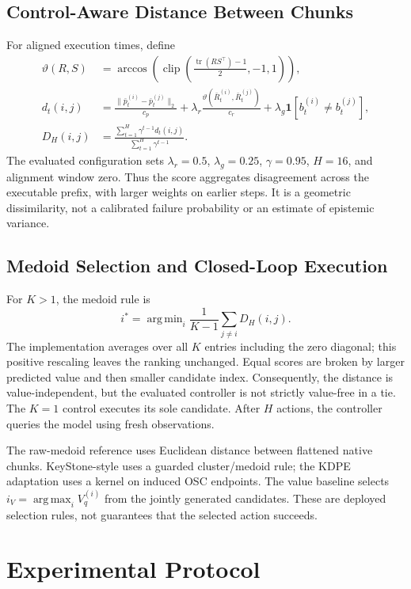 \documentclass{article}
\newcommand{\ind}{\mathbf{1}}
\DeclareMathOperator*{\argmax}{arg\,max}
\DeclareMathOperator*{\argmin}{arg\,min}
\DeclareMathOperator{\clip}{clip}
\DeclareMathOperator{\tr}{tr}
\begin{document}
\subsection{Control-Aware Distance Between Chunks}
For aligned execution times, define
\begin{align}
 \vartheta(R,S)
 &=\arccos\left(\clip\left(\frac{\tr(RS^\top)-1}{2},-1,1\right)\right),\\
 d_t(i,j)
 &=\frac{\|\bar p_t^{(i)}-\bar p_t^{(j)}\|_2}{c_p}
 +\lambda_r\frac{\vartheta(\bar R_t^{(i)},\bar R_t^{(j)})}{c_r}
 +\lambda_g\ind[b_t^{(i)}\ne b_t^{(j)}],\label{eq:action-distance}\\
 D_H(i,j)
 &=\frac{\sum_{t=1}^{H}\gamma^{t-1}d_t(i,j)}
         {\sum_{t=1}^{H}\gamma^{t-1}}.\label{eq:chunk-distance}
\end{align}
The evaluated configuration sets $\lambda_r=0.5$, $\lambda_g=0.25$,
$\gamma=0.95$, $H=16$, and alignment window zero. Thus the score aggregates
disagreement across the executable prefix, with larger weights on earlier
steps. It is a geometric dissimilarity, not a calibrated failure probability
or an estimate of epistemic variance.

\subsection{Medoid Selection and Closed-Loop Execution}
For $K>1$, the medoid rule is
\begin{equation}
 i^*=\argmin_i\frac{1}{K-1}\sum_{j\ne i}D_H(i,j).
 \label{eq:medoid}
\end{equation}
The implementation averages over all $K$ entries including the zero diagonal;
this positive rescaling leaves the ranking unchanged. Equal scores are broken
by larger predicted value and then smaller candidate index. Consequently,
the distance is value-independent, but the evaluated controller is not
strictly value-free in a tie. The $K=1$ control executes its sole candidate.
After $H$ actions, the controller queries the model using fresh observations.

The raw-medoid reference uses Euclidean distance between flattened native
chunks. KeyStone-style uses a guarded cluster/medoid rule; the KDPE adaptation
uses a kernel on induced OSC endpoints. The value baseline selects
$i_V=\argmax_i V_q^{(i)}$ from the jointly generated candidates. These are
deployed selection rules, not guarantees that the selected action succeeds.

\section{Experimental Protocol}
\label{sec:protocol}
\end{document}
